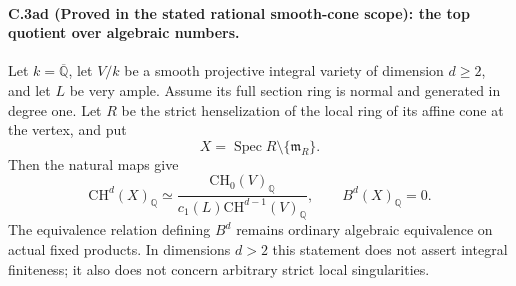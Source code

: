 \paragraph{C.3ad (Proved in the stated rational smooth-cone scope): the top quotient over algebraic numbers.}
Let $k=\overline{\mathbb Q}$, let $V/k$ be a smooth projective
integral variety of dimension $d\ge2$, and let $L$ be very ample.
Assume its full section ring is normal and generated in degree one.
Let $R$ be the strict henselization of the local ring of its affine
cone at the vertex, and put
\[
             X=\operatorname{Spec}R\setminus\{\mathfrak m_R\}.
\]
Then the natural maps give
\begin{equation}\label{eq:C3ad-top-cone}
 \mathrm{CH}^d(X)_{\mathbb Q}\simeq
 \frac{\mathrm{CH}_0(V)_{\mathbb Q}}
      {c_1(L)\mathrm{CH}^{d-1}(V)_{\mathbb Q}},
 \qquad B^d(X)_{\mathbb Q}=0.
\end{equation}
The equivalence relation defining $B^d$ remains ordinary
algebraic equivalence on actual fixed products. In dimensions
$d>2$ this statement does not assert integral finiteness;
it also does not concern arbitrary strict local singularities.

